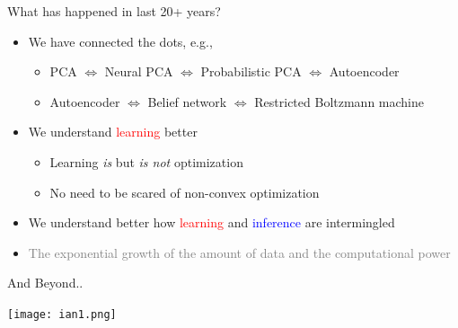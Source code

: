 \documentclass{beamer}
\newcommand{\tred}[1]{\textcolor{red}{#1}}
\newcommand{\tblue}[1]{\textcolor{blue}{#1}}
\begin{document}
\begin{frame}{What has happened in last 20+ years?}
    \begin{itemize}
        \item We have connected the dots, e.g.,
            \begin{itemize}
                \item PCA $\Leftrightarrow$ Neural PCA
                    $\Leftrightarrow$
                    Probabilistic PCA $\Leftrightarrow$ 
                    Autoencoder
                \item Autoencoder $\Leftrightarrow$ Belief
                    network $\Leftrightarrow$ Restricted
                    Boltzmann machine
            \end{itemize}
        \item We understand \tred{learning} better
            \begin{itemize}
                \item Learning \emph{is} but \emph{is not} optimization 
                \item No need to be scared of non-convex
                    optimization
            \end{itemize}
        \item We understand better how \tred{learning} and
            \tblue{inference} are intermingled
        \item \textcolor{gray}{The exponential growth of the amount of data
            and the computational power}
    \end{itemize}
\end{frame}


\begin{frame}{And Beyond..}

    \hspace*{-10.5mm}
    \texttt{[image: ian1.png]}

    
\end{frame}





\end{document}
